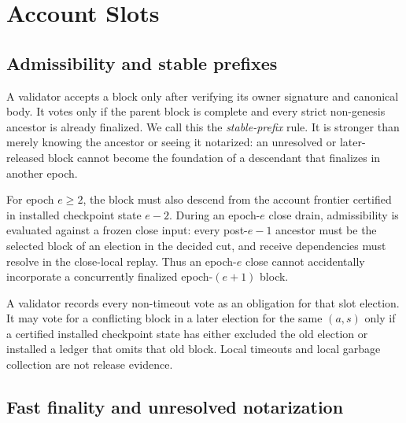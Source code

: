 \documentclass[sigplan,review,anonymous]{acmart}
\begin{document}
\section{Account Slots}
\label{sec:slots}

\subsection{Admissibility and stable prefixes}

A validator accepts a block only after verifying its owner signature and canonical body.  It votes only if the parent block is complete and every strict non-genesis ancestor is already finalized.  We call this the \emph{stable-prefix} rule.  It is stronger than merely knowing the ancestor or seeing it notarized: an unresolved or later-released block cannot become the foundation of a descendant that finalizes in another epoch.

For epoch $e\ge2$, the block must also descend from the account frontier certified in installed checkpoint state $e-2$.  During an epoch-$e$ close drain, admissibility is evaluated against a frozen close input: every post-$e-1$ ancestor must be the selected block of an election in the decided cut, and receive dependencies must resolve in the close-local replay.  Thus an epoch-$e$ close cannot accidentally incorporate a concurrently finalized epoch-$(e+1)$ block.

A validator records every non-timeout vote as an obligation for that slot election.  It may vote for a conflicting block in a later election for the same $(a,s)$ only if a certified installed checkpoint state has either excluded the old election or installed a ledger that omits that old block.  Local timeouts and local garbage collection are not release evidence.

\subsection{Fast finality and unresolved notarization}
\end{document}
